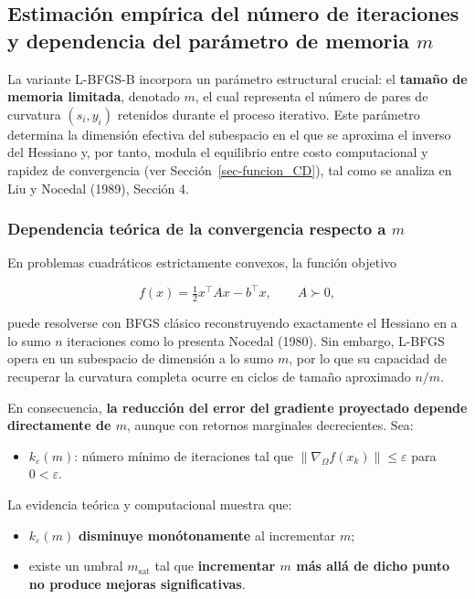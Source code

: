 \documentclass[
  spanish,
  us-letterpaper,
]{scrreprt}
\providecommand{\tightlist}{%
  \setlength{\itemsep}{0pt}\setlength{\parskip}{0pt}}
\numberwithin{equation}{section}
\begin{document}
\subsection{\texorpdfstring{Estimación empírica del número de
iteraciones y dependencia del parámetro de memoria
\(m\)}{Estimación empírica del número de iteraciones y dependencia del parámetro de memoria m}}\label{sec-memoria}

La variante L-BFGS-B incorpora un parámetro estructural crucial: el
\textbf{tamaño de memoria limitada}, denotado \(m\), el cual representa
el número de pares de curvatura \((s_i, y_i)\) retenidos durante el
proceso iterativo. Este parámetro determina la dimensión efectiva del
subespacio en el que se aproxima el inverso del Hessiano y, por tanto,
modula el equilibrio entre costo computacional y rapidez de convergencia
(ver Sección~\ref{sec-funcion_CD}), tal como se analiza en Liu y Nocedal
(1989), Sección 4.

\subsubsection{\texorpdfstring{Dependencia teórica de la convergencia
respecto a
\(m\)}{Dependencia teórica de la convergencia respecto a m}}\label{dependencia-teuxf3rica-de-la-convergencia-respecto-a-m}

En problemas cuadráticos estrictamente convexos, la función objetivo

\[
f(x) = \tfrac{1}{2} x^\top A x - b^\top x, \qquad A \succ 0,
\]

puede resolverse con BFGS clásico reconstruyendo exactamente el Hessiano
en a lo sumo \(n\) iteraciones como lo presenta Nocedal (1980). Sin
embargo, L-BFGS opera en un subespacio de dimensión a lo sumo \(m\), por
lo que su capacidad de recuperar la curvatura completa ocurre en ciclos
de tamaño aproximado \(n/m\).

En consecuencia, \textbf{la reducción del error del gradiente proyectado
depende directamente de \(m\)}, aunque con retornos marginales
decrecientes. Sea:

\begin{itemize}
\tightlist
\item
  \(k_{\varepsilon}(m)\): número mínimo de iteraciones tal que
  \(\|\nabla_\Omega f(x_k)\| \le \varepsilon\) para \(0 <\varepsilon\).
\end{itemize}

La evidencia teórica y computacional muestra que:

\begin{itemize}
\tightlist
\item
  \(k_{\varepsilon}(m)\) \textbf{disminuye monótonamente} al incrementar
  \(m\);
\item
  existe un umbral \(m_{\text{sat}}\) tal que \textbf{incrementar \(m\)
  más allá de dicho punto no produce mejoras significativas}.
\end{itemize}
\end{document}
